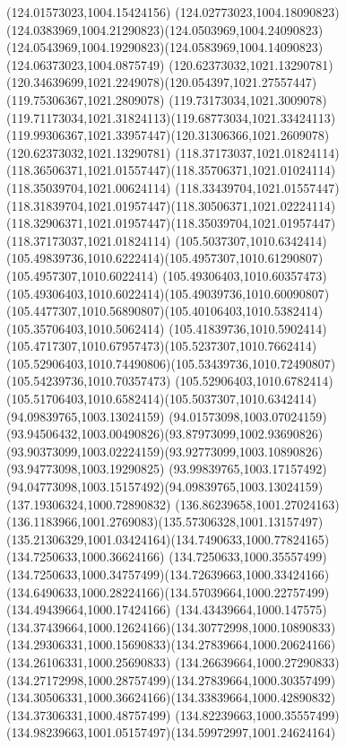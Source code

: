 {{		\moveto(124.01573023,1004.15424156)
		\curveto(124.02773023,1004.18090823)(124.0383969,1004.21290823)(124.0503969,1004.24090823)
		\curveto(124.0543969,1004.19290823)(124.0583969,1004.14090823)(124.06373023,1004.0875749)
		\closepath
		\moveto(120.62373032,1021.13290781)
		\curveto(120.34639699,1021.2249078)(120.054397,1021.27557447)(119.75306367,1021.2809078)
		\curveto(119.73173034,1021.3009078)(119.71173034,1021.31824113)(119.68773034,1021.33424113)
		\curveto(119.99306367,1021.33957447)(120.31306366,1021.2609078)(120.62373032,1021.13290781)
		\moveto(118.37173037,1021.01824114)
		\curveto(118.36506371,1021.01557447)(118.35706371,1021.01024114)(118.35039704,1021.00624114)
		\curveto(118.33439704,1021.01557447)(118.31839704,1021.01957447)(118.30506371,1021.02224114)
		\curveto(118.32906371,1021.01957447)(118.35039704,1021.01957447)(118.37173037,1021.01824114)
		\moveto(105.5037307,1010.6342414)
		\curveto(105.49839736,1010.6222414)(105.4957307,1010.61290807)(105.4957307,1010.6022414)
		\curveto(105.49306403,1010.60357473)(105.49306403,1010.6022414)(105.49039736,1010.60090807)
		\curveto(105.4477307,1010.56890807)(105.40106403,1010.5382414)(105.35706403,1010.5062414)
		\curveto(105.41839736,1010.5902414)(105.4717307,1010.67957473)(105.5237307,1010.7662414)
		\curveto(105.52906403,1010.74490806)(105.53439736,1010.72490807)(105.54239736,1010.70357473)
		\curveto(105.52906403,1010.6782414)(105.51706403,1010.6582414)(105.5037307,1010.6342414)
		\moveto(94.09839765,1003.13024159)
		\curveto(94.01573098,1003.07024159)(93.94506432,1003.00490826)(93.87973099,1002.93690826)
		\curveto(93.90373099,1003.02224159)(93.92773099,1003.10890826)(93.94773098,1003.19290825)
		\curveto(93.99839765,1003.17157492)(94.04773098,1003.15157492)(94.09839765,1003.13024159)
		\moveto(137.19306324,1000.72890832)
		\curveto(136.86239658,1001.27024163)(136.1183966,1001.2769083)(135.57306328,1001.13157497)
		\curveto(135.21306329,1001.03424164)(134.7490633,1000.77824165)(134.7250633,1000.36624166)
		\curveto(134.7250633,1000.35557499)(134.7250633,1000.34757499)(134.72639663,1000.33424166)
		\curveto(134.6490633,1000.28224166)(134.57039664,1000.22757499)(134.49439664,1000.17424166)
		\curveto(134.43439664,1000.147575)(134.37439664,1000.12624166)(134.30772998,1000.10890833)
		\curveto(134.29306331,1000.15690833)(134.27839664,1000.20624166)(134.26106331,1000.25690833)
		\curveto(134.26639664,1000.27290833)(134.27172998,1000.28757499)(134.27839664,1000.30357499)
		\curveto(134.30506331,1000.36624166)(134.33839664,1000.42890832)(134.37306331,1000.48757499)
		\curveto(134.82239663,1000.35557499)(134.98239663,1001.05157497)(134.59972997,1001.24624164)
}}
